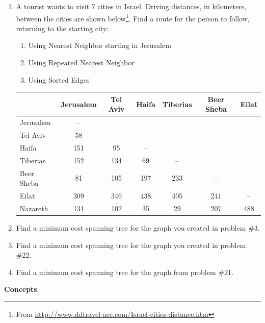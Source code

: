 \begin{enumerate}
\item	A tourist wants to visit 7 cities in Israel.  Driving distances, in kilometers, between the cities are shown below\footnote{From \url{http://www.ddtravel-acc.com/Israel-cities-distance.htm}}.  Find a route for the person to follow, returning to the starting city:
\begin{enumerate}
\item	Using Nearest Neighbor starting in Jerusalem
\item	Using Repeated Nearest Neighbor
\item	Using Sorted Edges
\end{enumerate}
\begin{center}
\begin{tabular}{|l|c|c|c|c|c|c|}
\hline
&Jerusalem&Tel Aviv&Haifa&Tiberias&Beer Sheba&Eilat\\
\hline
Jerusalem&--&&&&&\\
\hline
Tel Aviv&58&--&&&&\\
\hline
Haifa&151&95&--&&&\\
\hline
Tiberias&152&134&69&--&&\\
\hline
Beer Sheba&81&105&197&233&--&\\
\hline
Eilat&309&346&438&405&241&--\\
\hline
Nazareth&131&102&35&29&207&488\\
\hline
\end{tabular}
\end{center}


\item	Find a minimum cost spanning tree for the graph you created in problem \#3.\\

\item	Find a minimum cost spanning tree for the graph you created in problem \#22.\\

\item	Find a minimum cost spanning tree for the graph from problem \#21.\\
\end{enumerate}

\noindent \textbf{Concepts}

